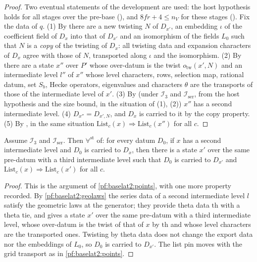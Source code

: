 \begin{proof}
Two eventual statements of the development are used: the host hypothesis holds for all stages over the
pre-base (), and $8fr+4\le n_V$ for these stages
(). Fix the data of $q$.
(1) By  there are a new twisting $N$ of
$D_{x'}$, an embedding $\iota$ of the coefficient field of $D_x$ into that of $D_{x'}$ and an isomorphism of
the fields $L_0$ such that $N$ is a \emph{copy} of the twisting of $D_x$: all twisting data and expansion
characters of $D_x$ agree with those of $N$, transported along $\iota$ and the isomorphism.
(2) By  there are a state $x''$ over $P'$ whose
over-datum is the twist $o_{\mathrm{tw}}(x',N)$ and an intermediate level $l''$ of $x''$ whose level characters, rows,
selection map, rational datum, set $S_b$, Hecke operators, eigenvalues and characters $\theta$ are the
transports of those of the intermediate level of $x'$.
(3) By  (under $\mathcal I_3$ and
$\mathcal I_{\mathrm{ser}}$, from the host hypothesis and the size bound, in the situation of (1), (2)) $x''$ has a
second intermediate level.
(4) $D_{x''}=D_{x',N}$, and $D_x$ is carried to it by the copy property.
(5) By , in the same situation
$\mathrm{List}_c(x)\Rightarrow\mathrm{List}_c(x'')$ for all $c$.
\end{proof}

\begin{lemma}\label{pf:baselat2:tob2}
Assume $\mathcal I_3$ and $\mathcal I_{\mathrm{ser}}$. Then $\forall^{\mathrm{st}}$ of: for every datum $D_0$, if $x$ has a
second intermediate level and $D_0$ is carried to $D_x$, then there is a state $x'$ over the same pre-datum
with a third intermediate level such that $D_0$ is carried to $D_{x'}$ and $\mathrm{List}_c(x)\Rightarrow\mathrm{List}_c(x')$
for all $c$.
\end{lemma}

\begin{proof}
This is the argument of \cref{pf:baselat2:points}, with one more property recorded. By
\cref{pf:baselat2:geolaws} the series data of a second intermediate level $l$ satisfy the geometric laws at
the generator; they provide theta data $\mathrm{th}$ with a theta tie, and
 gives a state $x'$ over the same pre-datum with a
third intermediate level, whose over-datum is the twist of that of $x$ by $\mathrm{th}$ and whose level characters
are the transported ones. Twisting by theta data does not change the export data nor the embeddings of $L_0$,
so $D_0$ is carried to $D_{x'}$. The list pin moves with
the grid transport as in \cref{pf:baselat2:points}.
\end{proof}

